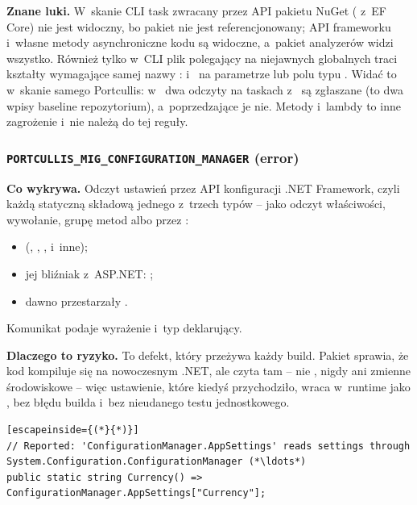 \textbf{Znane luki.} W~skanie CLI task zwracany przez API pakietu NuGet
( z~EF Core) nie jest widoczny, bo pakiet nie jest
referencjonowany; API frameworku i~własne metody asynchroniczne kodu są widoczne, a~pakiet
analyzerów widzi wszystko. Również tylko w~CLI plik polegający na niejawnych globalnych
 traci kształty wymagające samej nazwy :
 i~ na parametrze lub polu typu
. Widać to w~skanie samego Portcullis: w~
dwa odczyty  na taskach z~ są
zgłaszane (to dwa wpisy baseline repozytorium), a~poprzedzające je 
nie. Metody i~lambdy  to inne zagrożenie i~nie należą do tej reguły.

\subsubsection{\texttt{PORTCULLIS\_MIG\_CONFIGURATION\_MANAGER} (error)}

\textbf{Co wykrywa.} Odczyt ustawień przez API konfiguracji .NET Framework, czyli każdą
statyczną składową jednego z~trzech typów -- jako odczyt właściwości, wywołanie, grupę
metod albo przez :
\begin{itemize}[leftmargin=*]
  \item {} (,
        , , 
        i~inne);
  \item jej bliźniak z~ASP.NET: ;
  \item dawno przestarzały .
\end{itemize}
Komunikat podaje wyrażenie i~typ deklarujący.

\textbf{Dlaczego to ryzyko.} To defekt, który przeżywa każdy build. Pakiet
 sprawia, że kod kompiluje się na
nowoczesnym .NET, ale czyta tam  -- nie ,
nigdy  ani zmienne środowiskowe -- więc ustawienie, które kiedyś
przychodziło, wraca w~runtime jako , bez błędu builda i~bez nieudanego testu
jednostkowego.

\begin{lstlisting}[escapeinside={(*}{*)}]
// Reported: 'ConfigurationManager.AppSettings' reads settings through System.Configuration.ConfigurationManager (*\ldots*)
public static string Currency() => ConfigurationManager.AppSettings["Currency"];
\end{lstlisting}

